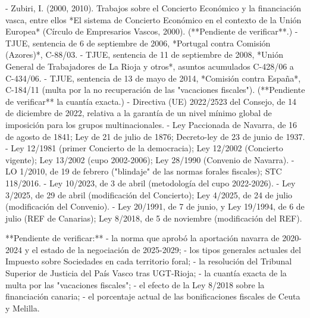 \documentclass[10pt,a4paper]{article}
\begin{document}
{- Zubiri, I. (2000, 2010). Trabajos sobre el Concierto Económico y la financiación vasca, entre ellos *El sistema de Concierto Económico en el contexto de la Unión Europea* (Círculo de Empresarios Vascos, 2000). (**Pendiente de verificar**.)
- TJUE, sentencia de 6 de septiembre de 2006, *Portugal contra Comisión (Azores)*, C-88/03.
- TJUE, sentencia de 11 de septiembre de 2008, *Unión General de Trabajadores de La Rioja y otros*, asuntos acumulados C-428/06 a C-434/06.
- TJUE, sentencia de 13 de mayo de 2014, *Comisión contra España*, C-184/11 (multa por la no recuperación de las "vacaciones fiscales"). (**Pendiente de verificar** la cuantía exacta.)
- Directiva (UE) 2022/2523 del Consejo, de 14 de diciembre de 2022, relativa a la garantía de un nivel mínimo global de imposición para los grupos multinacionales.
- Ley Paccionada de Navarra, de 16 de agosto de 1841; Ley de 21 de julio de 1876; Decreto-ley de 23 de junio de 1937.
- Ley 12/1981 (primer Concierto de la democracia); Ley 12/2002 (Concierto vigente); Ley 13/2002 (cupo 2002-2006); Ley 28/1990 (Convenio de Navarra).
- LO 1/2010, de 19 de febrero ("blindaje" de las normas forales fiscales); STC 118/2016.
- Ley 10/2023, de 3 de abril (metodología del cupo 2022-2026).
- Ley 3/2025, de 29 de abril (modificación del Concierto); Ley 4/2025, de 24 de julio (modificación del Convenio).
- Ley 20/1991, de 7 de junio, y Ley 19/1994, de 6 de julio (REF de Canarias); Ley 8/2018, de 5 de noviembre (modificación del REF).

**Pendiente de verificar:**
- la norma que aprobó la aportación navarra de 2020-2024 y el estado de la negociación de 2025-2029;
- los tipos generales actuales del Impuesto sobre Sociedades en cada territorio foral;
- la resolución del Tribunal Superior de Justicia del País Vasco tras UGT-Rioja;
- la cuantía exacta de la multa por las "vacaciones fiscales";
- el efecto de la Ley 8/2018 sobre la financiación canaria;
- el porcentaje actual de las bonificaciones fiscales de Ceuta y Melilla.

}
\end{document}
